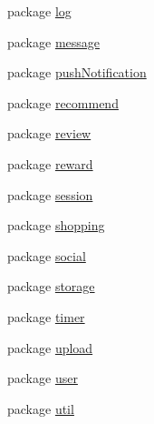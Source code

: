 \begin{DoxyCompactItemize}
\item 
package \hyperlink{namespacecom_1_1shephertz_1_1app42_1_1paas_1_1sdk_1_1csharp_1_1log}{log}
\item 
package \hyperlink{namespacecom_1_1shephertz_1_1app42_1_1paas_1_1sdk_1_1csharp_1_1message}{message}
\item 
package \hyperlink{namespacecom_1_1shephertz_1_1app42_1_1paas_1_1sdk_1_1csharp_1_1push_notification}{push\+Notification}
\item 
package \hyperlink{namespacecom_1_1shephertz_1_1app42_1_1paas_1_1sdk_1_1csharp_1_1recommend}{recommend}
\item 
package \hyperlink{namespacecom_1_1shephertz_1_1app42_1_1paas_1_1sdk_1_1csharp_1_1review}{review}
\item 
package \hyperlink{namespacecom_1_1shephertz_1_1app42_1_1paas_1_1sdk_1_1csharp_1_1reward}{reward}
\item 
package \hyperlink{namespacecom_1_1shephertz_1_1app42_1_1paas_1_1sdk_1_1csharp_1_1session}{session}
\item 
package \hyperlink{namespacecom_1_1shephertz_1_1app42_1_1paas_1_1sdk_1_1csharp_1_1shopping}{shopping}
\item 
package \hyperlink{namespacecom_1_1shephertz_1_1app42_1_1paas_1_1sdk_1_1csharp_1_1social}{social}
\item 
package \hyperlink{namespacecom_1_1shephertz_1_1app42_1_1paas_1_1sdk_1_1csharp_1_1storage}{storage}
\item 
package \hyperlink{namespacecom_1_1shephertz_1_1app42_1_1paas_1_1sdk_1_1csharp_1_1timer}{timer}
\item 
package \hyperlink{namespacecom_1_1shephertz_1_1app42_1_1paas_1_1sdk_1_1csharp_1_1upload}{upload}
\item 
package \hyperlink{namespacecom_1_1shephertz_1_1app42_1_1paas_1_1sdk_1_1csharp_1_1user}{user}
\item 
package \hyperlink{namespacecom_1_1shephertz_1_1app42_1_1paas_1_1sdk_1_1csharp_1_1util}{util}
\end{DoxyCompactItemize}
